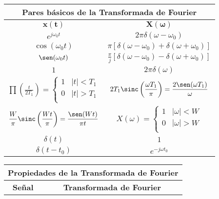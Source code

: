 \documentclass[12pt,es,blanco]{uah}
\begin{document}
\begin{center}
    \renewcommand{\arraystretch}{1.5}
    \begin{tabular}{|c|c|}
        \multicolumn{2}{c}{{\bf Pares básicos de la Transformada de Fourier }} \\
        \hline
        $\mathbf{x(t)}$ & $\mathbf{X(\omega)}$ \\
        \hline
        $e^{j\omega_0 t }$ & $2\pi\delta (\omega-\omega_0)$ \\
        \hline
        $\cos(\omega_0 t)$ & $\pi \left [ \delta(\omega-\omega_0 ) + \delta(\omega+\omega_0 ) \right ]$\\
        \hline
        $\sen(\omega_0 t)$ & $\displaystyle\frac{\pi}{j} \left [ \delta(\omega-\omega_0 ) - \delta(\omega+\omega_0 ) \right ]$\\
        \hline
        $1$ & $2\pi\delta(\omega)$ \\
        \hline
        $\prod \left ( \displaystyle\frac{t}{2T_1}\right ) = \left \{ \begin{array}{lc} 1 & |t| < T_1 \\ 0 & |t| >T_1 \\ \end{array} \right.$ & $2 T_1 \sinc\left ( \displaystyle\frac{\omega T_1}{\pi} \right ) = \displaystyle\frac{2 \sen(\omega T_1)}{\omega}$ \\
        \hline 
        $\displaystyle\frac{W}{\pi} \sinc\left ( \frac{Wt}{\pi} \right ) = \displaystyle\frac{\sen(Wt)}{\pi t}$ & $X(\omega) = \left \{ \begin{array}{lc} 1 & |\omega| < W \\ 0 & |\omega| >W \\ \end{array} \right. $ \\ 
        \hline 
        $\delta(t)$ & $1$ \\
        \hline
        $\delta(t-t_0)$ & $e^{-j \omega t_0}$ \\
        \hline
    \end{tabular}
    \renewcommand{\arraystretch}{1}
    \vspace{0.5cm}
    \renewcommand{\arraystretch}{1.5}
    \begin{tabular}{|c|c|}
        \multicolumn{2}{c}{{\bf Propiedades de la Transformada de Fourier }} \\
        \hline
        {\bf Señal} & {\bf Transformada de Fourier} \\

\end{tabular}
\end{center}
\end{document}
